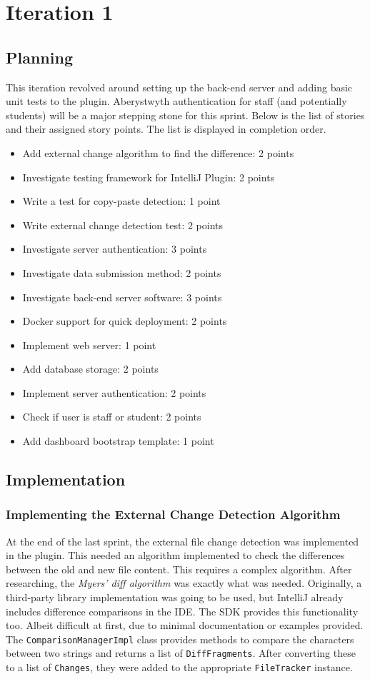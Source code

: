 \chapter{Iteration 1}
\label{it:1}
\section{Planning}
This iteration revolved around setting up the back-end server and adding basic unit tests to the plugin. Aberystwyth authentication for staff (and potentially students) will be a major stepping stone for this sprint. Below is the list of stories and their assigned story points. The list is displayed in completion order.

\begin{itemize}
\item Add external change algorithm to find the difference: 2 points
\item Investigate testing framework for IntelliJ Plugin: 2 points
\item Write a test for copy-paste detection: 1 point
\item Write external change detection test: 2 points
\item Investigate server authentication: 3 points
\item Investigate data submission method: 2 points
\item Investigate back-end server software: 3 points
\item Docker support for quick deployment: 2 points
\item Implement web server: 1 point
\item Add database storage: 2 points
\item Implement server authentication: 2 points
\item Check if user is staff or student: 2 points
\item Add dashboard bootstrap template: 1 point
\end{itemize}

\section{Implementation}
\subsection{Implementing the External Change Detection Algorithm}
At the end of the last sprint, the external file change detection was implemented in the plugin. This needed an algorithm implemented to check the differences between the old and new file content. This requires a complex algorithm. After researching, the \textit{Myers' diff algorithm} was exactly what was needed. Originally, a third-party library implementation was going to be used, but IntelliJ already includes difference comparisons in the IDE. The SDK provides this functionality too. Albeit difficult at first, due to minimal documentation or examples provided. The \texttt{ComparisonManagerImpl} class provides methods to compare the characters between two strings and returns a list of \texttt{DiffFragments}. After converting these to a list of \texttt{Changes}, they were added to the appropriate \texttt{FileTracker} instance.

